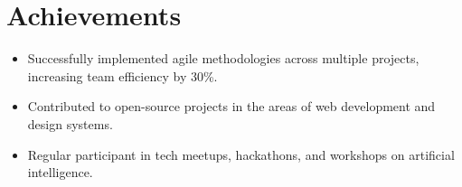 \documentclass[letterpaper,11pt]{article}
\begin{document}
\section{Achievements}
\begin{itemize}
\item Successfully implemented agile methodologies across multiple projects, increasing team efficiency by 30\%.
\item Contributed to open-source projects in the areas of web development and design systems.
\item Regular participant in tech meetups, hackathons, and workshops on artificial intelligence.
\end{itemize}
\end{document}
